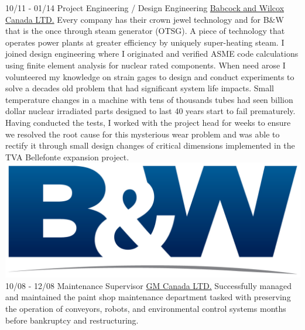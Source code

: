 \documentclass[]{friggeri-cv}
\begin{document}
\begin{entrylist}
  \wentry
    {10/11 - 01/14}
    {Project Engineering / Design Engineering}
    {\href{https://www.bwxt.com/}{Babcock and Wilcox Canada LTD.}}
    {Every company has their crown jewel technology and for B$\&$W that is the once through steam generator (OTSG). A piece of technology that operates power plants at greater efficiency by uniquely super-heating steam. I joined design engineering where I originated and verified ASME code calculations using finite element analysis for nuclear rated components. When need arose I volunteered my knowledge on strain gages to design and conduct experiments to solve a decades old problem that had significant system life impacts. Small temperature changes in a machine with tens of thousands tubes had seen billion dollar nuclear irradiated parts designed to last 40 years start to fail prematurely. Having conducted the tests, I worked with the project head for weeks to ensure we resolved the root cause for this mysterious wear problem and was able to rectify it through small design changes of critical dimensions implemented in the TVA Bellefonte expansion project.}
    {\includegraphics[scale=0.18]{img/Babcock-Wilcox.jpg}}
    \wentry
    {10/08 - 12/08}
    {Maintenance Supervisor}
    {\href{https://www.gm.ca/en/home.html}{GM Canada LTD.}}
    {Successfully managed and maintained the paint shop maintenance department tasked with preserving the operation of conveyors, robots, and environmental control systems months before bankruptcy and restructuring.}
    {}
\end{entrylist}
\newpage
\end{document}
